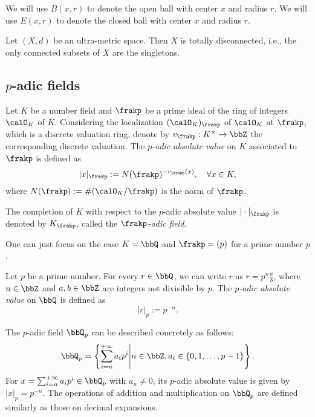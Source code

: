     We will use \(B(x,r)\) to denote the open ball with center \(x\) and radius \(r\).
    We will use \(E(x,r)\) to denote the closed ball with center \(x\) and radius \(r\).

    \begin{proposition}\label{prop:ultra-metric_space_is_totally_disconnected}
        Let \((X,d)\) be an ultra-metric space.
        Then \(X\) is totally disconnected, i.e., the only connected subsets of \(X\) are the singletons.
    \end{proposition}


\subsection[p-adic fields]{\(p\)-adic fields}

    
    \begin{construction}\label{constr:p-adic_absolute_value_on_number_field}
        Let \(K\) be a number field and \(\frakp\) be a prime ideal of the ring of integers \(\calO_K\) of \(K\).
        Considering the localization \((\calO_K)_\frakp\) of \(\calO_K\) at \(\frakp\), which is a discrete valuation ring, denote by \(v_\frakp: K^\times \to \bbZ\) the corresponding discrete valuation.
        The \emph{\(p\)-adic absolute value} on \(K\) associated to \(\frakp\) is defined as
        \[ |x|_\frakp := N(\frakp)^{-v_\frakp(x)},\quad\forall x \in K, \]
        where \(N(\frakp) := \#(\calO_K / \frakp)\) is the norm of \(\frakp\).

        The completion of \(K\) with respect to the \(p\)-adic absolute value \(|\cdot|_\frakp\) is denoted by \(K_\frakp\), called the \emph{\(\frakp\)-adic field}.
    \end{construction}

    One can just focus on the case \(K = \bbQ\) and \(\frakp = (p)\) for a prime number \(p\).

    \begin{example}\label{eg:p-adic_field}
        Let \(p\) be a prime number. 
        For every \(r \in \bbQ\), we can write \(r\) as \(r = p^n \frac{a}{b}\), where \(n \in \bbZ\) and \(a,b \in \bbZ\) are integers not divisible by \(p\).
        The \emph{\(p\)-adic absolute value} on \(\bbQ\) is defined as
        \[ |r|_p := p^{-n}. \]
      
        The \(p\)-adic field \(\bbQ_p\) can be described concretely as follows:
        \[ \bbQ_p = \left\{ \sum_{i = n}^{+\infty} a_i p^i \middle| n \in \bbZ, a_i \in \{0, 1, \ldots, p-1\} \right\}. \]
        For \(x = \sum_{i = n}^{+\infty} a_i p^i \in \bbQ_p\) with \(a_n \neq 0\), its \(p\)-adic absolute value is given by \(|x|_p = p^{-n}\).
        The operations of addition and multiplication on \(\bbQ_p\) are defined similarly as those on decimal expansions.
    \end{example}

